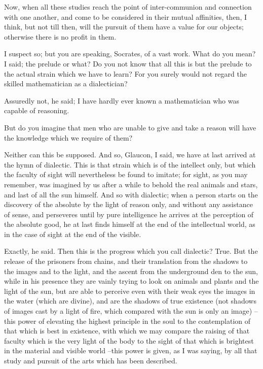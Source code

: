 Now, when all these studies reach the point of inter-communion and connection with one another, and come to be considered in their mutual affinities, then, I think, but not till then, will the pursuit of them have a value for our objects; otherwise there is no profit in them.

I suspect so; but you are speaking, Socrates, of a vast work.
What do you mean? I said; the prelude or what? Do you not know that all this is but the prelude to the actual strain which we have to learn? For you surely would not regard the skilled mathematician as a dialectician?

Assuredly not, he said; I have hardly ever known a mathematician who was capable of reasoning.

But do you imagine that men who are unable to give and take a reason will have the knowledge which we require of them?

Neither can this be supposed.
And so, Glaucon, I said, we have at last arrived at the hymn of dialectic. This is that strain which is of the intellect only, but which the faculty of sight will nevertheless be found to imitate; for sight, as you may remember, was imagined by us after a while to behold the real animals and stars, and last of all the sun himself. And so with dialectic; when a person starts on the discovery of the absolute by the light of reason only, and without any assistance of sense, and perseveres until by pure intelligence he arrives at the perception of the absolute good, he at last finds himself at the end of the intellectual world, as in the case of sight at the end of the visible.

Exactly, he said.
Then this is the progress which you call dialectic?
True.
But the release of the prisoners from chains, and their translation from the shadows to the images and to the light, and the ascent from the underground den to the sun, while in his presence they are vainly trying to look on animals and plants and the light of the sun, but are able to perceive even with their weak eyes the images in the water (which are divine), and are the shadows of true existence (not shadows of images cast by a light of fire, which compared with the sun is only an image) --this power of elevating the highest principle in the soul to the contemplation of that which is best in existence, with which we may compare the raising of that faculty which is the very light of the body to the sight of that which is brightest in the material and visible world --this power is given, as I was saying, by all that study and pursuit of the arts which has been described.

